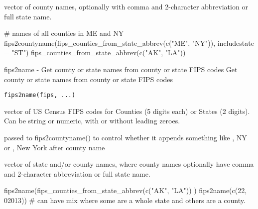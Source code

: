 \documentclass[a4paper]{book}
\begin{document}
%
\begin{Value}
vector of county names, optionally with comma and 2-character abbreviation or full state name.
\end{Value}
%
\begin{Examples}
\begin{ExampleCode}
  # names of all counties in ME and NY
  fips2countyname(fips_counties_from_state_abbrev(c("ME", "NY")), includestate = "ST")
   fips_counties_from_state_abbrev(c("AK", "LA"))  
\end{ExampleCode}
\end{Examples}
%
\begin{Description}\relax
fips2name - Get county or state names from county or state FIPS codes
Get county or state names from county or state FIPS codes
\end{Description}
%
\begin{Usage}
\begin{verbatim}
fips2name(fips, ...)
\end{verbatim}
\end{Usage}
%
\begin{Arguments}
\begin{ldescription}
\item[\code{fips}] vector of US Census FIPS codes for Counties (5 digits each) or States (2 digits).
Can be string or numeric, with or without leading zeroes.

\item[\code{...}] passed to fips2countyname() to control whether it appends something like , NY or , New York
after county name
\end{ldescription}
\end{Arguments}
%
\begin{Value}
vector of state and/or county names,
where county names optionally have comma and 2-character abbreviation or full state name.
\end{Value}
%
\begin{Examples}
\begin{ExampleCode}
  fips2name(fips_counties_from_state_abbrev(c("AK", "LA"))  )
  fips2name(c(22, 02013))  # can have mix where some are a whole state and others are a county.
\end{ExampleCode}
\end{Examples}
\end{document}
